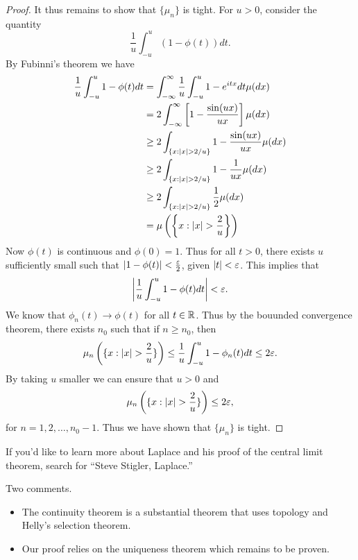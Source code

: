 \begin{proof}
    It thus remains to show that $\{\mu_n\}$ is tight. For $u >0$, consider the quantity
    \[\frac{1}{u}\int_{-u}^u (1-\phi(t))dt. \]
    By Fubinni's theorem we have
    \begin{align*}
        \frac{1}{u}\int_{-u}^u 1 -\phi(t)dt &= \int_{-\infty}^\infty \frac{1}{u}\int_{-u}^u 1-e^{itx}dt \mu(dx)\\
        &= 2 \int_{-\infty}^\infty \left[1-\frac{\sin(ux)}{ux}\right]\mu(dx)\\
        &\ge 2\int_{\{x:{\left\lvert x\right\rvert}>2/u\}} 1-\frac{\sin(ux)}{ux}\mu(dx)\\
        &\ge 2\int_{\{x:{\left\lvert x\right\rvert}>2/u\}} 1-\frac{1}{ux}\mu(dx)\\
        &\ge 2\int_{\{x:{\left\lvert x\right\rvert}>2/u\}} \frac{1}{2}\mu(dx)\\
        &=\mu\left(\left\{x:{\left\lvert x\right\rvert} > \frac{2}{u}\right\}\right)
    \end{align*}
    Now $\phi(t)$ is continuous and $\phi(0)=1$. Thus for all $t>0$, there exists $u$ sufficiently small such that ${\left\lvert1-\phi(t)\right\rvert}< \frac{\varepsilon}{2}$, given ${\left\lvert t\right\rvert} <\varepsilon$. This implies that 
    \[{\left\lvert\frac{1}{u}\int_{-u}^u 1-\phi(t)dt\right\rvert} < \varepsilon. \]
    We know that $\phi_n(t) \to \phi(t)$ for all $t \in {\mathbb R}$. Thus by the bouunded convergence theorem, there exists $n_0$ such that if $n \ge n_0$, then 
    \[\mu_n\left(\{x:{\left\lvert x\right\rvert}> \frac{2}{u}\}\right) \le \frac{1}{u}\int_{-u}^u 1-\phi_n(t)dt \le 2 \varepsilon. \]
    By taking $u$ smaller we can ensure that $u>0$ and 
    \[\mu_n\left(\{x:{\left\lvert x\right\rvert}> \frac{2}{u}\}\right) \le 2\varepsilon, \]
    for $n=1,2,\ldots,n_0-1$. Thus we have shown that $\{\mu_n\}$ is tight. 
\end{proof}
If you'd like to learn more about Laplace and his proof of the central limit theorem, search for ``Steve Stigler, Laplace.''
\begin{remark}
    Two comments.
    \begin{itemize}
        \item The continuity theorem is a substantial theorem that uses topology and Helly's selection theorem.
        \item Our proof relies on the uniqueness theorem which remains to be proven.
    \end{itemize}
\end{remark}
